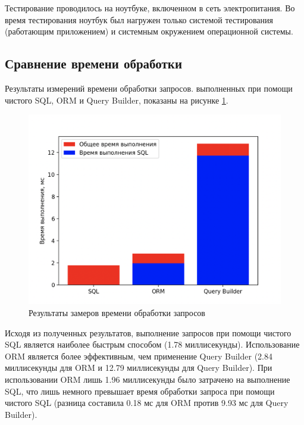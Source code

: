 Тестирование проводилось на ноутбуке, включенном в сеть электропитания. Во время тестирования ноутбук был нагружен только системой тестирования (работающим приложением) и системным окружением операционной системы.

\subsection{Сравнение времени обработки}

Результаты измерений  времени обработки запросов. выполненных при помощи чистого SQL, ORM и Query Builder, показаны на рисунке \ref{fig:research}.

\begin{figure}[h]
	\centering
	\captionsetup{justification=centering}
	\includegraphics[width=130mm]{img/research.png}
	\caption{Результаты замеров времени обработки запросов}
	\label{fig:research}
\end{figure}


Исходя из полученных результатов, выполнение запросов при помощи чистого SQL является наиболее быстрым способом (1.78 миллисекунды). Использование ORM является более эффективным, чем применение Query Builder (2.84 миллисекунды для ORM и 12.79 миллисекунды для Query Builder). При использовании ORM лишь 1.96 миллисекунды было затрачено на выполнение SQL, что лишь немного превышает время обработки запроса при помощи чистого SQL (разница составила 0.18 мс для ORM против 9.93 мс для Query Builder).

